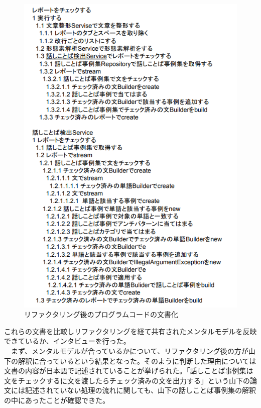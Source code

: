 \documentclass[11pt, a4paper]{jreport}
\begin{document}
\begin{figure}[H]
\centering
\includegraphics[width=1\linewidth]{image/modelAf.png}
\caption{リファクタリング後のプログラムコードの文書化}
\label{fig:enter-label}
\end{figure}
これらの文書を比較しリファクタリングを経て共有されたメンタルモデルを反映できているか、インタビューを行った。
\\　まず、メンタルモデルが合っているかについて、リファクタリング後の方が山下の解釈に合っているという結果となった。そのように判断した理由については文書の内容が日本語で記述されていることが挙げられた。「話しことば事例集は文をチェックするに文を渡したらチェック済みの文を出力する」という山下の論文には記述されていない処理の流れに関しても、山下の話しことば事例集の解釈の中にあったことが確認できた。
\end{document}

